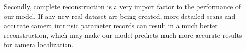 Secondly, complete reconstruction is a very import factor to the performance of our model. If any new real dataset are being created, more detailed scans and accurate camera intrinsic parameter records can result in a much better reconstruction, which may make our model predicts much more accurate results for camera localization.